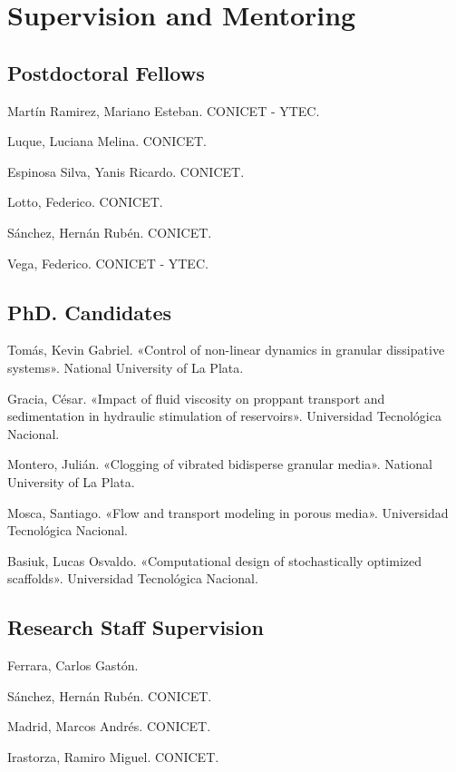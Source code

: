 \section*{Supervision and Mentoring}

\subsection*{Postdoctoral Fellows}
\begin{timeline}
 Martín Ramirez, Mariano Esteban. CONICET - YTEC.

 Luque, Luciana Melina. CONICET.

 Espinosa Silva, Yanis Ricardo. CONICET.

 Lotto, Federico. CONICET.

 Sánchez, Hernán Rubén. CONICET.

 Vega, Federico. CONICET - YTEC.
\end{timeline}

\subsection*{PhD. Candidates}

\begin{timeline}
 Tomás, Kevin Gabriel. «Control of non-linear dynamics in granular dissipative systems». National University of La Plata.

 Gracia, César. «Impact of fluid viscosity on proppant transport and sedimentation in hydraulic stimulation of reservoirs». Universidad Tecnológica Nacional.

 Montero, Julián. «Clogging of vibrated bidisperse granular media». National University of La Plata.

 Mosca, Santiago. «Flow and transport modeling in porous media». Universidad Tecnológica Nacional.

 Basiuk, Lucas Osvaldo. «Computational design of stochastically optimized scaffolds». Universidad Tecnológica Nacional.
\end{timeline}

\subsection*{Research Staff Supervision}

\begin{timeline}
 Ferrara, Carlos Gastón.

 Sánchez, Hernán Rubén. CONICET.

 Madrid, Marcos Andrés. CONICET.

 Irastorza, Ramiro Miguel. CONICET.
\end{timeline}